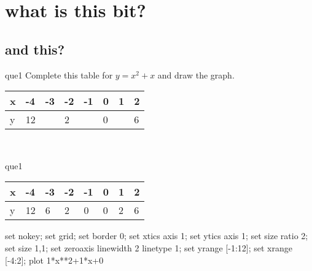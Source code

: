 \documentclass[13.5pt, varwidth=true]{beamer}
\begin{document}
\date{}

\section[Graphs]{what is this bit?}
\subsection[title]{and this?}

\begin{frame}[shrink=19,fragile]
	\begin{beamercolorbox}[rounded=true, left, shadow=true,wd=14.8cm]{que1}
		 Complete this table for $y = x^{2} + x$ and draw the graph. \\[0.3cm] \renewcommand{\arraystretch}{1.2}\begin{tabular}{|C|C|C|C|C|C|C|C|} \hline x & -4 & -3 & -2 & -1 & 0 & 1 & 2 \\ \hline y & 12 &  & 2 &  & 0 &  & 6\\ \hline \end{tabular}\\[0.3cm]
	\end{beamercolorbox}
\end{frame}
\begin{frame}[shrink=19,fragile]
	\begin{beamercolorbox}[rounded=true, left, shadow=true,wd=14.8cm]{que1}
		\renewcommand{\arraystretch}{1.2}\begin{tabular}{|C|C|C|C|C|C|C|C|} \hline x & -4 & -3 & -2 & -1 & 0 & 1 & 2 \\ \hline y & 12 & 6 & 2 & 0 & 0 & 2 & 6\\ \hline \end{tabular}\begin{gnuplot}[terminal=pdf] set nokey; set grid; set border 0; set xtics axis 1; set ytics axis 1; set size ratio 2; set size 1,1; set zeroaxis linewidth 2 linetype 1; set yrange [-1:12]; set xrange [-4:2]; plot 1*x**2+1*x+0 \end{gnuplot}
	\end{beamercolorbox}
\end{frame}
\end{document}
